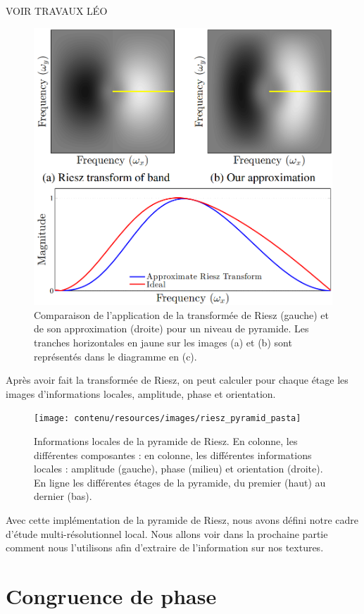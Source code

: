 {\color{red}VOIR TRAVAUX LÉO}


\bigskip

\begin{figure}
    \centering
    \includegraphics[width=.65\textwidth]{contenu/resources/images/riesz_approximation}
    \caption[Approximation de la transformée de Riesz]{Comparaison de l'application de la transformée de Riesz (gauche) et de son approximation (droite) pour un niveau de pyramide. Les tranches horizontales en jaune sur les images (a) et (b) sont représentés dans le diagramme en (c).}
    \label{fig:riesz-approximation}
\end{figure}

Après avoir fait la transformée de Riesz, on peut calculer pour chaque étage les images d'informations locales, amplitude, phase et orientation.

\bigskip

\begin{figure}[hp]
    \centering
    \texttt{[image: contenu/resources/images/riesz\_pyramid\_pasta]}
    \caption[Informations locales de la pyramide de Riesz]{Informations locales de la pyramide de Riesz. En colonne, les différentes composantes : en colonne, les différentes informations locales : amplitude (gauche), phase (milieu) et orientation (droite). En ligne les différentes étages de la pyramide, du premier (haut) au dernier (bas).}
    \label{fig:riesz-pyramid-local}
\end{figure}

Avec cette implémentation de la pyramide de Riesz, nous avons défini notre cadre d'étude multi-résolutionnel local. Nous allons voir dans la prochaine partie comment nous l'utilisons afin d'extraire de l'information sur nos textures.

\section{Congruence de phase}

